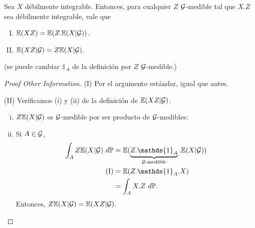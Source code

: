 \begin{prop}
	Sea $X$ débilmente integrable. Entonces, para cualquier $Z$ $\mathcal{G}$-medible tal que $X.Z$ sea débilmente integrable, vale que
	\begin{enumerate}[(I)]
		\item $\mathbb{E}(XZ) = \mathbb{E}(Z . \mathbb{E}(X | \mathcal{G}))$.

		\item $\mathbb{E}(XZ | \mathcal{G}) = Z \mathbb{E}(X | \mathcal{G})$.
	\end{enumerate}
	(se puede cambiar $\mathds{1}_{A}$ de la definición por $Z$ $\mathcal{G}$-medible.)
\end{prop}
\begin{proof}[Proof Other Information]
	(I) Por el argumento estándar, igual que antes. \par
	(II) Verificamos (i) y (ii) de la definición de $\mathbb{E}(XZ | \mathcal{G})$.
	\begin{enumerate}[i)]
		\item $Z \mathbb{E}(X | \mathcal{G})$ es $\mathcal{G}$-medible por ser producto de $\mathcal{G}$-medibles;

		\item Si $A \in \mathcal{G}$,
		\begin{align*}
			\int_{A} Z \mbb{E}(X | \mcal{G}) \ d \mbb{P} &= \mbb{E}(\underbrace{Z . \mathds{1}_{A}}_{\mcal{G}\text{-medible}} . \mbb{E}(X | \mcal{G})) \\
			\text{(I)} &= \mbb{E}(Z . \mathds{1}_{A} . X) \\
			&= \int_{A} X . Z \ d\mbb{P}
		.\end{align*}
		Entonces, $Z \mathbb{E}(X | \mathcal{G}) = \mathbb{E}(XZ | \mathcal{G})$.
	\qedhere\end{enumerate}
\end{proof}
